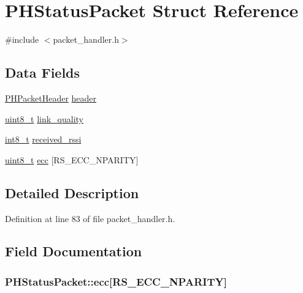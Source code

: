 \hypertarget{struct_p_h_status_packet}{\section{P\-H\-Status\-Packet Struct Reference}
\label{struct_p_h_status_packet}
}


{\ttfamily \#include $<$packet\-\_\-handler.\-h$>$}

\subsection*{Data Fields}
\begin{DoxyCompactItemize}
\item 
\hyperlink{struct_p_h_packet_header}{P\-H\-Packet\-Header} \hyperlink{struct_p_h_status_packet_a01617aa2bca7a093aa2dd7a2e7edc47a}{header}
\item 
\hyperlink{stdint_8h_aba7bc1797add20fe3efdf37ced1182c5}{uint8\-\_\-t} \hyperlink{struct_p_h_status_packet_ac78a8f872dbb6ece46016b5fdc901037}{link\-\_\-quality}
\item 
\hyperlink{stdint_8h_ad566f6541e98b74246db1a3a3a85ad49}{int8\-\_\-t} \hyperlink{struct_p_h_status_packet_a8dcb964e68ef8dbed6c28e6418dc3e2e}{received\-\_\-rssi}
\item 
\hyperlink{stdint_8h_aba7bc1797add20fe3efdf37ced1182c5}{uint8\-\_\-t} \hyperlink{struct_p_h_status_packet_a6ae4779221b82cd043d0798111010d42}{ecc} \mbox{[}R\-S\-\_\-\-E\-C\-C\-\_\-\-N\-P\-A\-R\-I\-T\-Y\mbox{]}
\end{DoxyCompactItemize}


\subsection{Detailed Description}


Definition at line 83 of file packet\-\_\-handler.\-h.



\subsection{Field Documentation}
\hypertarget{struct_p_h_status_packet_a6ae4779221b82cd043d0798111010d42}{
\subsubsection[{ecc}]{ P\-H\-Status\-Packet\-::ecc\mbox{[}R\-S\-\_\-\-E\-C\-C\-\_\-\-N\-P\-A\-R\-I\-T\-Y\mbox{]}}}\label{struct_p_h_status_packet_a6ae4779221b82cd043d0798111010d42}


